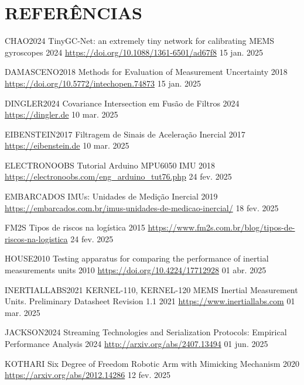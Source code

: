 \newpage
\pagestyle{modeloReferencias}
\section*{REFERÊNCIAS}
\vspace{-1cm}

    {CHAO2024}
    {TinyGC-Net: an extremely tiny network for calibrating MEMS gyroscopes}
    {2024}
    {\url{https://doi.org/10.1088/1361-6501/ad67f8}}
    {15 jan. 2025}

    {DAMASCENO2018}
    {Methods for Evaluation of Measurement Uncertainty}
    {2018}
    {\url{https://doi.org/10.5772/intechopen.74873}}
    {15 jan. 2025}

    {DINGLER2024}
    {Covariance Intersection em Fusão de Filtros}
    {2024}
    {\url{https://dingler.de}}
    {10 mar. 2025}

    {EIBENSTEIN2017}
    {Filtragem de Sinais de Aceleração Inercial}
    {2017}
    {\url{https://eibenstein.de}}
    {10 mar. 2025}

    {ELECTRONOOBS}
    {Tutorial Arduino MPU6050 IMU}
    {2018}
    {\url{https://electronoobs.com/eng_arduino_tut76.php}}
    {24 fev. 2025}

    {EMBARCADOS}
    {IMUs: Unidades de Medição Inercial}
    {2019}
    {\url{https://embarcados.com.br/imus-unidades-de-medicao-inercial/}}
    {18 fev. 2025}

    {FM2S}
    {Tipos de riscos na logística}
    {2015}
    {\url{https://www.fm2s.com.br/blog/tipos-de-riscos-na-logistica}}
    {24 fev. 2025}

    {HOUSE2010}
    {Testing apparatus for comparing the performance of inertial measurements units}
    {2010}
    {\url{https://doi.org/10.4224/17712928}}
    {01 abr. 2025}

    {INERTIALLABS2021}
    {KERNEL-110, KERNEL-120 MEMS Inertial Measurement Units. Preliminary Datasheet Revision 1.1}
    {2021}
    {\url{https://www.inertiallabs.com}}
    {01 mar. 2025}

    {JACKSON2024}
    {Streaming Technologies and Serialization Protocols: Empirical Performance Analysis}
    {2024}
    {\url{http://arxiv.org/abs/2407.13494}}
    {01 jun. 2025}

    {KOTHARI}
    {Six Degree of Freedom Robotic Arm with Mimicking Mechanism}
    {2020}
    {\url{https://arxiv.org/abs/2012.14286}}
    {12 fev. 2025}


